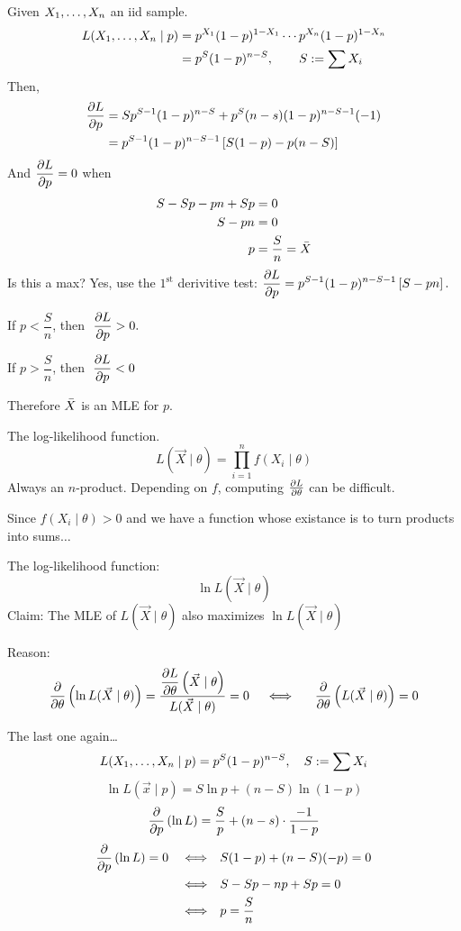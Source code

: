 \nl Given ${X}_1, \dots, {X}_n$ an iid sample.
\begin{align}
    L({X}_1, \dots, {X}_n \mid p) &= p^{X_1}(1-p)^{1-X_1} \cdots p^{X_n}(1-p)^{1-X_n} \notag\\
    &= p^S(1-p)^{n-S}, \qquad S := \sum X_i\notag
\end{align}
Then,
\begin{align}
    \pdv{L}{p} &= Sp^{S-1}(1-p)^{n-S} + p^S (n-s)(1-p)^{n-S-1} (-1)\notag\\
    &= p^{S-1}(1-p)^{n-S-1}\brac{S(1-p)-p(n-S)}\notag
\end{align}
And $\displaystyle \pdv{L}{p} = 0$ when 
\begin{align}
    S - Sp - pn + Sp &= 0\notag\\
    S-pn &= 0\notag\\
    p &= \frac{S}{n} = \bar{X}\notag
\end{align}
Is this a max? Yes, use the $1^{\text{st}}$ derivitive test: $\displaystyle \pdv{L}{p} = p^{S-1}(1-p)^{n-S-1} \brac{S-pn}.$

\nl If $p < \dfrac{S}{n}$, then $\;\displaystyle \pdv{L}{p} > 0.\;$

\nl If $p > \dfrac{S}{n}$, then $\;\displaystyle \pdv{L}{p} < 0$

\nl Therefore $\bar{X}$ is an MLE for $p$. 

\disc The log-likelihood function.
$$L(\vec{X} \mid \theta) = \prod_{i=1}^n f(X_i \mid \theta)$$
Always an $n$-product. Depending on $f$, computing $\pdv{L}{\theta}$ can be difficult.

\nl Since $f(X_i \mid \theta) > 0$ and we have a function whose existance is to turn products into sums$\dots$

 The log-likelihood function:
$$\ln L(\vec{X} \mid \theta)$$
Claim: The MLE of $L(\vec{X} \mid \theta)$ also maximizes $\ln L(\vec{X} \mid \theta)$

\nl Reason:
$$\pdv{}{\theta}\pars{\ln L(\vec{X} \mid \theta)} = \frac{\displaystyle \pdv{L}{\theta} \pars{\vec{X}\mid \theta}}{L(\vec{X} \mid \theta)} = 0 \quad \iff \quad \; \pdv{}{\theta}\pars{L(\vec{X} \mid \theta)} = 0$$

\example The last one again\dots
$$L({X}_1, \dots, {X}_n\mid p) = p^S (1-p)^{n-S}, \quad S := \sum X_i$$
$$\ln L(\vec{x} \mid p) = S\ln p + (n-S)\ln (1-p)$$
$$\pdv{}{p}\pars{\ln L} = \frac{S}{p} + (n-s) \cdot \frac{-1}{1-p}$$
\begin{align}
    \pdv{}{p}\pars{\ln L} = 0 \quad \Longleftrightarrow& \quad S(1-p) + (n-S)(-p) = 0\notag\\
    \Longleftrightarrow& \quad S - Sp - np + Sp = 0\notag\\
    \Longleftrightarrow& \quad p = \frac{S}{n}\notag
\end{align}

